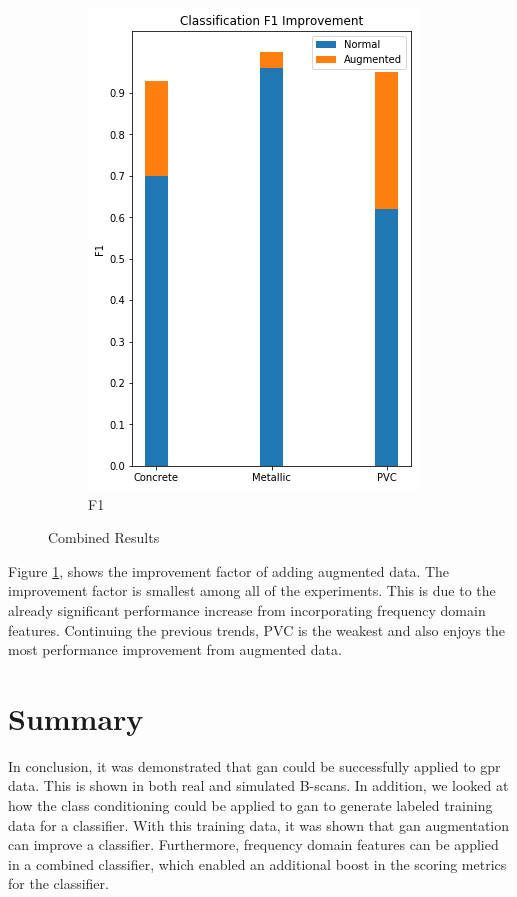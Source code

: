 \begin{figure}[H]
\begin{subfigure}[b]{0.4\linewidth}
    \includegraphics[width=\linewidth]{figures/Combined-F1.png}
    \caption{F1}
  \end{subfigure}
  \caption{Combined Results}
  \label{fig:combined-results}
\end{figure}

Figure \ref{fig:combined-results}, shows the improvement factor of adding augmented data. The improvement factor is smallest among all of the experiments. This is due to the already significant performance increase from incorporating frequency domain features. Continuing the previous trends, PVC is the weakest and also enjoys the most performance improvement from augmented data. 

\section{Summary}
In conclusion, it was demonstrated that \acrshort{gan} could be successfully applied to \acrshort{gpr} data. This is shown in both real and simulated B-scans. In addition, we looked at how the class conditioning could be applied to \acrshort{gan} to generate labeled training data for a classifier. With this training data, it was shown that \acrshort{gan} augmentation can improve a classifier. Furthermore, frequency domain features can be applied in a combined classifier, which enabled an additional boost in the scoring metrics for the classifier.